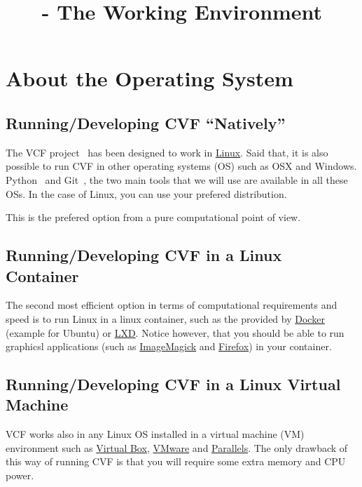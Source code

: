 
\title{\SM{} - The Working Environment}

\maketitle

\tableofcontents

\section{About the Operating System}

\subsection{Running/Developing CVF ``Natively''}
The VCF project~\cite{vruiz__VCF} has been designed to work in
\href{https://en.wikipedia.org/wiki/Linux}{Linux}. Said that, it is
also possible to run CVF in other operating systems (OS) such as OSX
and Windows. Python~\cite{vruiz__YAPT} and Git~\cite{vruiz__GitHub},
the two main tools that we will use are available in all these OSs. In
the case of Linux, you can use your prefered distribution.

This is the prefered option from a pure computational point of view.

\subsection{Running/Developing CVF in a Linux Container}
The second most efficient option in terms of computational
requirements and speed is to run Linux in a linux container, such
as the provided by \href{https://linuxcontainers.org/}{Docker}
(example for Ubuntu)
or \href{https://linuxcontainers.org/}{LXD}. Notice however, that you
should be able to run graphicsl applications (such
as \href{https://linuxcontainers.org/}{ImageMagick}
and \href{https://www.mozilla.org/firefox}{Firefox}) in your
container.

\subsection{Running/Developing CVF in a Linux Virtual Machine}
VCF works also in any Linux OS installed in a virtual machine (VM)
environment such as \href{https://www.virtualbox.org/}{Virtual Box},
\href{https://www.vmware.com/}{VMware} and \href{https://www.vmware.com/}{Parallels}.
The only drawback of this way of running CVF is that you will require
some extra memory and CPU power.

